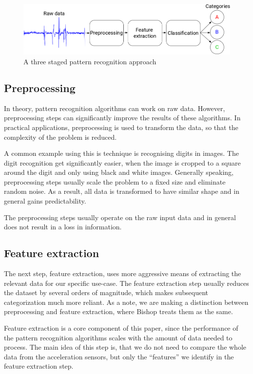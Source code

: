 \begin{figure}
    \centering
    \includegraphics[width=\textwidth]{figures/PatternRecognitionSteps.png}
    \caption{A three staged pattern recognition approach}
    \label{fig:patternrecognitionsteps}
\end{figure}

\subsection{Preprocessing}
In theory, pattern recognition algorithms can work on raw data. However, preprocessing steps can significantly improve the results of these algorithms. In practical applications, preprocessing is used to transform the data, so that the complexity of the problem is reduced. 

A common example using this is technique is recognising digits in images. The digit recognition get significantly easier, when the image is cropped to a square around the digit and only using black and white images. Generally speaking, preprocessing steps usually scale the problem to a fixed size and eliminate random noise. As a result, all data is transformed to have similar shape and in general gains predictability.

The preprocessing steps usually operate on the raw input data and in general does not result in a loss in information.

\subsection{Feature extraction}
The next step, feature extraction, uses more aggressive means of extracting the relevant data for our specific use-case. The feature extraction step usually reduces the dataset by several orders of magnitude, which makes subsequent categorization much more reliant. As a note, we are making a distinction between preprocessing and feature extraction, where Bishop\cite{bishop2006pattern} treats them as the same.

Feature extraction is a core component of this paper, since the performance of the pattern recognition algorithms scales with the amount of data needed to process. The main idea of this step is, that we do not need to compare the whole data from the acceleration sensors, but only the ``features'' we identify in the feature extraction step.

